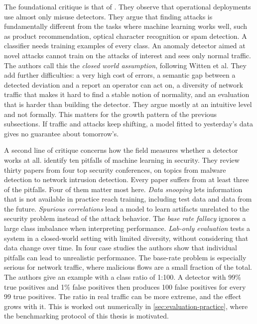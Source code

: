 The foundational critique is that of \citet{sommer2010outside}. They observe
that operational deployments use almost only misuse detectors. They argue
that finding attacks is fundamentally different from the tasks where machine
learning works well, such as product recommendation, optical character
recognition or spam detection. A classifier needs training examples of every
class. An anomaly detector aimed at novel attacks cannot train on the
attacks of interest and sees only normal traffic. The authors call this the
\emph{closed world assumption}, following Witten et al. They add further
difficulties: a very high cost of errors, a semantic gap between a detected
deviation and a report an operator can act on, a diversity of network
traffic that makes it hard to find a stable notion of normality, and an
evaluation that is harder than building the detector. They argue mostly at
an intuitive level and not formally. This matters for the growth pattern of
the previous subsections. If traffic and attacks keep shifting, a model
fitted to yesterday's data gives no guarantee about tomorrow's.

A second line of critique concerns how the field measures whether a
detector works at all. \citet{arp2022dosdonts} identify ten pitfalls of
machine learning in security. They review thirty papers from four top
security conferences, on topics from malware detection to network intrusion
detection. Every paper suffers from at least three of the pitfalls. Four
of them matter most here. \emph{Data snooping} lets information that is not
available in practice reach training, including test data and data from the
future. \emph{Spurious correlations} lead a model to learn artifacts
unrelated to the security problem instead of the attack behavior. The
\emph{base rate fallacy} ignores a large class imbalance when interpreting
performance. \emph{Lab-only evaluation} tests a system in a closed-world
setting with limited diversity, without considering that data change over
time. In four case studies the authors show that individual pitfalls can
lead to unrealistic performance. The base-rate problem is especially serious
for network traffic, where malicious flows are a small fraction of the
total. The authors give an example with a class ratio of 1:100. A detector
with 99\% true positives and 1\% false positives then produces 100 false
positives for every 99 true positives. The ratio in real traffic can be more
extreme, and the effect grows with it. This is worked out numerically in
\cref{sec:evaluation-practice}, where the benchmarking protocol of this
thesis is motivated.


